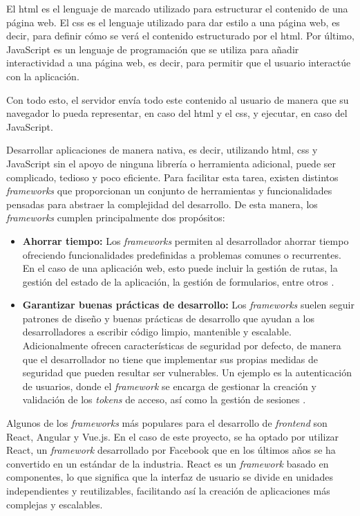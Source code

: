 El \gls{html} es el lenguaje de marcado utilizado para estructurar el contenido de una página web. El \gls{css} es el lenguaje utilizado para dar estilo a una página web, es decir, para definir cómo se verá el contenido estructurado por el \gls{html}. Por último, JavaScript es un lenguaje de programación que se utiliza para añadir interactividad a una página web, es decir, para permitir que el usuario interactúe con la aplicación.

Con todo esto, el servidor envía todo este contenido al usuario de manera que su navegador lo pueda representar, en caso del \gls{html} y el \gls{css}, y ejecutar, en caso del JavaScript.

Desarrollar aplicaciones de manera nativa, es decir, utilizando \gls{html}, \gls{css} y JavaScript sin el apoyo de ninguna librería o herramienta adicional, puede ser complicado, tedioso y poco eficiente. Para facilitar esta tarea, existen distintos \textit{frameworks} que proporcionan un conjunto de herramientas y funcionalidades pensadas para abstraer la complejidad del desarrollo. De esta manera, los \textit{frameworks} cumplen principalmente dos propósitos:

\begin{itemize}
    \item \textbf{Ahorrar tiempo:} Los \textit{frameworks} permiten al desarrollador ahorrar tiempo ofreciendo funcionalidades predefinidas a problemas comunes o recurrentes. En el caso de una aplicación web, esto puede incluir la gestión de rutas, la gestión del estado de la aplicación, la gestión de formularios, entre otros \cite{framworks}.
    \item \textbf{Garantizar buenas prácticas de desarrollo:} Los \textit{frameworks} suelen seguir patrones de diseño y buenas prácticas de desarrollo que ayudan a los desarrolladores a escribir código limpio, mantenible y escalable. Adicionalmente ofrecen características de seguridad por defecto, de manera que el desarrollador no tiene que implementar sus propias medidas de seguridad que pueden resultar ser vulnerables. Un ejemplo es la autenticación de usuarios, donde el \textit{framework} se encarga de gestionar la creación y validación de los \textit{tokens} de acceso, así como la gestión de sesiones \cite{framworks}.
\end{itemize}

Algunos de los \textit{frameworks} más populares para el desarrollo de \textit{frontend} son React, Angular y Vue.js. En el caso de este proyecto, se ha optado por utilizar React, un \textit{framework} desarrollado por Facebook que en los últimos años se ha convertido en un estándar de la industria. React es un \textit{framework} basado en componentes, lo que significa que la interfaz de usuario se divide en unidades independientes y reutilizables, facilitando así la creación de aplicaciones más complejas y escalables.

